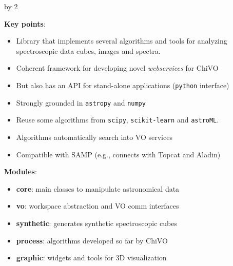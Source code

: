 \documentclass[11pt]{scrartcl}
\def\anzspalten{2}
\newlength{\kastenwidth}
\newenvironment{kasten}{
  \begin{lrbox}{\dummybox}
    \begin{minipage}{\linewidth}}
    {\end{minipage}
  \end{lrbox}
  \raisebox{-\depth}{\psshadowbox[cornersize=absolute,linearc=14pt,framesep=1em]{\usebox{\dummybox}}}\\[0.5em]}
\newenvironment{spalte}{
  \setlength\kastenwidth{1.2\textwidth}
  \divide\kastenwidth by \anzspalten
  \begin{minipage}[t]{\kastenwidth}}{\end{minipage}}
\begin{document}
\begin{lrbox}{\spalten}
{\begin{spalte}
\begin{kasten}
\begin{minipage}{0.4\textwidth}
\textbf{Key points}:
\begin{itemize}
\item Library that implements several algorithms and
tools for analyzing spectroscopic data cubes, images and spectra.
\item Coherent framework for developing novel \emph{webservices} for ChiVO
\item But also has an API for stand-alone applications (\texttt{python} interface)
\item Strongly grounded in \texttt{astropy} and \texttt{numpy}
\item Reuse some algorithms from \texttt{scipy}, \texttt{scikit-learn} and
\texttt{astroML}.
\item Algorithms automatically search into VO services 
\item Compatible with SAMP (e.g., connects with Topcat and Aladin)
\end{itemize}
\textbf{Modules}:
\begin{itemize}
\item \textbf{core}: main classes to manipulate astronomical data
\item \textbf{vo}: workspace abstraction and VO comm interfaces
\item \textbf{synthetic}: generates synthetic spectroscopic cubes
\item \textbf{process}: algorithms developed so far by ChiVO
\item \textbf{graphic}: widgets and tools for 3D visualization  
\end{itemize}

		\end{minipage} 
\mbox{}\\
      
\end{kasten}\hfill

	\begin{kasten}

\end{kasten}
\end{spalte}}
\end{lrbox}
\end{document}
